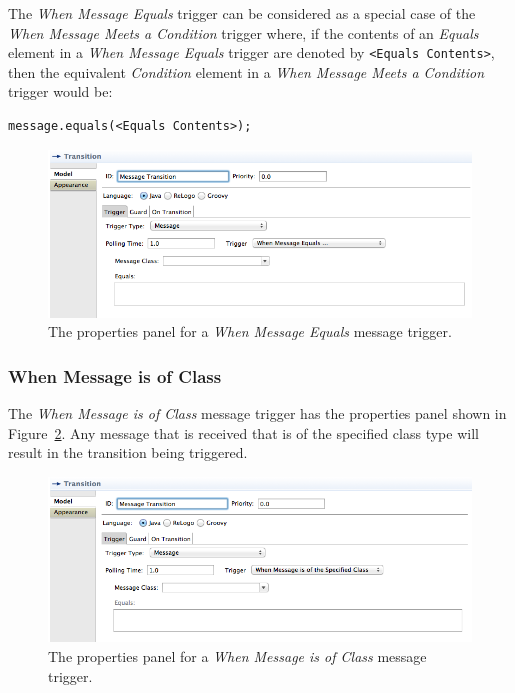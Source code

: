 \documentclass[11pt]{amsart}
\begin{document}
The \emph{When Message Equals} trigger can be considered as a special case of the \emph{When Message Meets a Condition} trigger where, if the contents of an \emph{Equals} element in a \emph{When Message Equals} trigger are denoted by  \texttt{<Equals Contents>}, then the equivalent \emph{Condition} element in a \emph{When Message Meets a Condition} trigger would be:
\begin{verbatim}message.equals(<Equals Contents>);\end{verbatim}

\begin{figure}
\begin{center}
\vspace{.2in}
\centerline {
\includegraphics[width=5in]{StatechartsImages/Message2TransitionProperties.png}
}
\caption{The properties panel for a \emph{When Message Equals} message trigger.}
\label{fig:message2TransitionProperties}
\end{center}
\end{figure}
\clearpage


\subsubsection{When Message is of Class}
The \emph{When Message is of Class} message trigger has the properties panel shown in Figure~\ref{fig:message3TransitionProperties}. Any message that is received that is of the specified class type will result in the transition being triggered.

\begin{figure}
\begin{center}
\vspace{.2in}
\centerline {
\includegraphics[width=5in]{StatechartsImages/Message3TransitionProperties.png}
}
\caption{The properties panel for a \emph{When Message is of Class} message trigger.}
\label{fig:message3TransitionProperties}
\end{center}
\end{figure}
\end{document}
